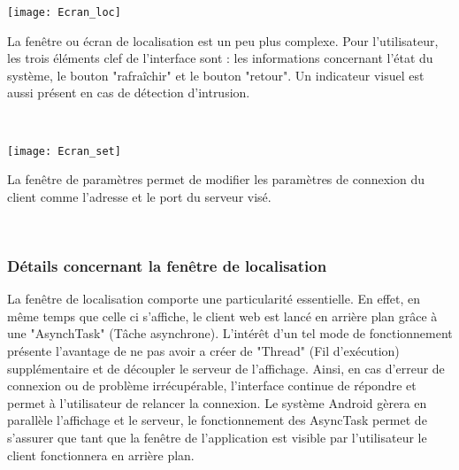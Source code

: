 	\begin{minipage}{0.45\linewidth}
 		\centering
 	 \texttt{[image: Ecran\_loc]}
	\end{minipage}
	\begin{minipage}{0.45\linewidth}
	 La fenêtre ou écran de localisation est un peu plus complexe. Pour l'utilisateur, les trois éléments clef de l'interface sont : les informations concernant l'état du système, le bouton "rafraîchir" et le bouton "retour". Un indicateur visuel est aussi présent en cas de détection d'intrusion.
	\end{minipage}
	~\\
	
	\begin{minipage}{0.45\linewidth}
  	\centering
 	 \texttt{[image: Ecran\_set]}
	\end{minipage}
	\begin{minipage}{0.45\linewidth}
	La fenêtre de paramètres permet de modifier les paramètres de connexion du client comme l'adresse et le port du serveur visé.
	\end{minipage}
	~\\	
	
\subsubsection{Détails concernant la fenêtre de localisation}

	La fenêtre de localisation comporte une particularité essentielle. En effet, en même temps que celle ci s'affiche, le client web est lancé en arrière plan grâce à une "AsynchTask" (Tâche asynchrone). L'intérêt d'un tel mode de fonctionnement présente l'avantage de ne pas avoir a créer de "Thread" (Fil d'exécution) supplémentaire et de découpler le serveur de l'affichage. Ainsi, en cas d'erreur de connexion ou de problème irrécupérable, l'interface continue de répondre et permet à l'utilisateur de relancer la connexion. Le système Android gèrera en parallèle l'affichage et le serveur, le fonctionnement des AsyncTask permet de s'assurer que tant que la fenêtre de l'application est visible par l'utilisateur le client fonctionnera en arrière plan.
	
	 

	


